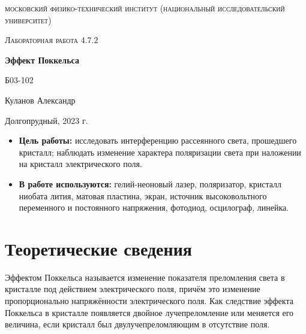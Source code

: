 \documentclass[a4paper, 12pt]{article}
\begin{document}
\begin{titlepage}
	\centering
	\vspace{5cm}
	{\scshape\LARGE московский физико-технический институт (национальный исследовательский университет) \par}
	\vspace{6cm}
	{\scshape\Large Лабораторная работа 4.7.2 \par}
	{\huge\bfseries Эффект Поккельса \par}
	\vspace{1cm}
	\vfill
\begin{flushright}
	{\large Б03-102}\par
	\vspace{0.3cm}
	{\LARGE Куланов Александр}
\end{flushright}
	

	\vfill


	Долгопрудный, 2023 г.
\end{titlepage}

\begin{itemize}
	\item \textbf{Цель работы:} исследовать интерференцию рассеянного света, прошедшего кристалл; наблюдать изменение характера поляризации света при наложении на кристалл электрического поля.
    \item \textbf{В работе используются:} гелий-неоновый лазер, поляризатор, кристалл ниобата лития, матовая пластина, экран, источник высоковольтного переменного и постоянного напряжения, фотодиод, осцилограф, линейка.
\end{itemize}
\section{Теоретические сведения}

Эффектом Поккельса называется изменение показателя преломления света в кристалле под действием электрического поля, причём это изменение пропорционально напряжённости электрического поля. Как следствие эффекта Поккельса в кристалле появляется двойное лучепреломление или меняется его величина, если кристалл был двулучепреломляющим в отсутствие поля.
\end{document}
